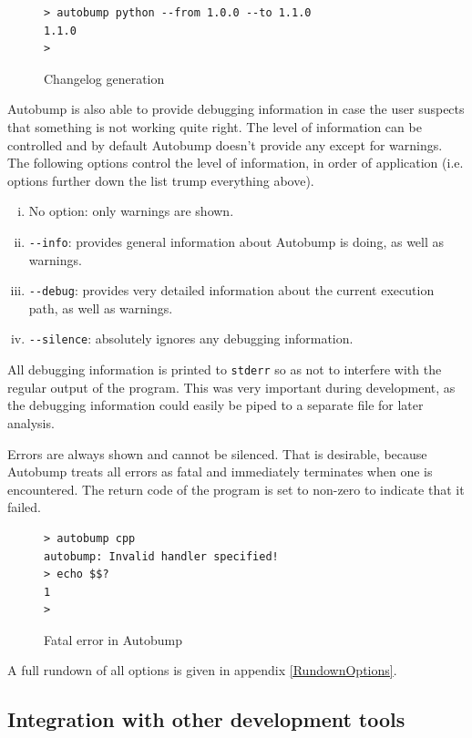 \documentclass{l4proj}
\newcommand\genericstyle{\lstset{basicstyle=\ttm}}
\newcommand\codeinline[1]{{\genericstyle\lstinline!#1!}}
\begin{document}
\begin{figure}[H]
\centering
\caption{Changelog generation}
\begin{BVerbatim}
> autobump python --from 1.0.0 --to 1.1.0
1.1.0
>
\end{BVerbatim}
\end{figure}

Autobump is also able to provide debugging information in case the
user suspects that something is not working quite right. The level of
information can be controlled and by default Autobump doesn't provide
any except for warnings. The following options control the level of
information, in order of application (i.e. options further down the
list trump everything above).

\begin{enumerate}[(i)]
\item No option: only warnings are shown.
\item \codeinline{--info}: provides general information about Autobump
is doing, as well as warnings.
\item \codeinline{--debug}: provides very detailed information about
the current execution path, as well as warnings.
\item \codeinline{--silence}: absolutely ignores any debugging
information.
\end{enumerate}

All debugging information is printed to \codeinline{stderr} so as not
to interfere with the regular output of the program. This was very
important during development, as the debugging information could
easily be piped to a separate file for later analysis.

Errors are always shown and cannot be silenced. That is desirable,
because Autobump treats all errors as fatal and immediately terminates
when one is encountered. The return code of the program is set to
non-zero to indicate that it failed.

\begin{figure}[H]
\centering
\caption{Fatal error in Autobump}
\begin{BVerbatim}
> autobump cpp
autobump: Invalid handler specified!
> echo $$?
1
>
\end{BVerbatim}
\end{figure}

A full rundown of all options is given in appendix \ref{RundownOptions}.

\subsection{Integration with other development tools}
\end{document}

